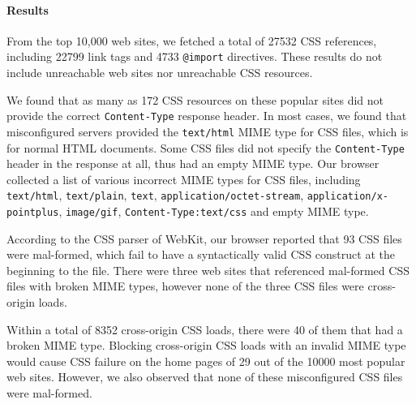 \documentclass{acm_proc_article-sp}
\begin{document}
{\paragraph{Results}
From the top 10,000 web sites, we fetched a total of 27532 CSS references, including 22799 link tags and 4733 \texttt{@import} directives. These results do not include unreachable web sites nor unreachable CSS resources.

We found that as many as 172 CSS resources on these popular sites did not provide the correct \texttt{Content-Type} response header. In most cases, we found that misconfigured servers provided the \texttt{text/html} MIME type for CSS files, which is for normal HTML documents. Some CSS files did not specify the \texttt{Content-Type} header in the response at all, thus had an empty MIME type. Our browser collected a list of various incorrect MIME types for CSS files, including \texttt{text/html}, \texttt{text/plain}, \texttt{text}, \texttt{application/octet-stream}, \texttt{application/x-pointplus}, \texttt{image/gif}, \texttt{Content-Type:text/css} and empty MIME type.

According to the CSS parser of WebKit, our browser reported that 93 CSS files were mal-formed, which fail to have a syntactically valid CSS construct at the beginning to the file. There were three web sites that referenced mal-formed CSS files with broken MIME types, however none of the three CSS files were cross-origin loads.

Within a total of 8352 cross-origin CSS loads, there were 40 of them that had a broken MIME type. Blocking cross-origin CSS loads with an invalid MIME type would cause CSS failure on the home pages of 29 out of the 10000 most popular web sites. However, we also observed that none of these misconfigured CSS files were mal-formed.


}
\end{document}
